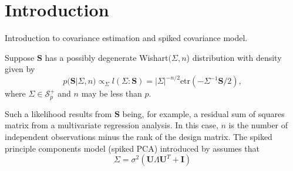 \documentclass{article}
\newcommand{\bl}[1]{{\mathbf #1}}
\begin{document}



\section{Introduction}

Introduction to covariance estimation and spiked covariance model.

Suppose $\bl S$ has a possibly degenerate Wishart$(\Sigma,n$) 
distribution with density 
given by 
\begin{equation} 
p(\bl S | \Sigma, n) \propto_{\Sigma} l(\Sigma:\bl S) =  |\Sigma|^{-n/2} \text{etr}( - \Sigma^{-1} \bl S/2 ) ,  
\label{eqn:lik}
\end{equation}
where $\Sigma \in \mathcal S_p^+$ and $n$ may be less than $p$. 

 
Such a likelihood results from $\bl S$ being, for example, a residual 
sum of squares matrix from a multivariate regression analysis. In  this case,
$n$ is the number of independent observations minus the 
rank of the design matrix. 
The spiked principle 
components model (spiked PCA) introduced by \citet{Johnstone2001} assumes that 
\begin{equation} 
\Sigma = \sigma^2 (  \bl U  \Lambda  \bl U^T  + \bl I )
\label{eqn:spiked}
\end{equation}
\end{document}

